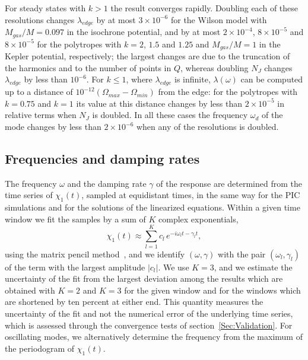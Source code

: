 For steady states with $k > 1$ the result converges rapidly. Doubling each of these resolutions changes $\lambda_{edge}$ by at most $3\times 10^{-6}$ for the Wilson model with $M_{gas}/M = 0.097$ in the isochrone potential, and by at most $2\times 10^{-4}$, $8\times 10^{-5}$ and $8\times 10^{-5}$ for the polytropes with $k = 2$, $1.5$ and $1.25$ and $M_{gas}/M = 1$ in the Kepler potential, respectively; the largest changes are due to the truncation of the harmonics and to the number of points in $Q$, whereas doubling $N_J$ changes $\lambda_{edge}$ by less than $10^{-6}$. For $k\leq 1$, where $\lambda_{edge}$ is infinite, $\lambda(\omega)$ can be computed up to a distance of $10^{-12}(\Omega_{max} - \Omega_{min})$ from the edge: for the polytropes with $k = 0.75$ and $k = 1$ its value at this distance changes by less than $2\times 10^{-5}$ in relative terms when $N_J$ is doubled. In all these cases the frequency $\omega_d$ of the mode changes by less than $2\times 10^{-6}$ when any of the resolutions is doubled.


\subsection{Frequencies and damping rates}
\label{SubSec:Fits}

The frequency $\omega$ and the damping rate $\gamma$ of the response are determined from the time series of $\chi_1(t)$, sampled at equidistant times, in the same way for the PIC simulations and for the solutions of the linearized equations. Within a given time window we fit the samples by a sum of $K$ complex exponentials,
\begin{equation}
\chi_1(t)\approx \sum\limits_{l=1}^K c_l\, e^{-i\omega_l t - \gamma_l t},
\label{Eq:PencilFit}
\end{equation}
using the matrix pencil method~\cite{yHtS90}, and we identify $(\omega,\gamma)$ with the pair $(\omega_l,\gamma_l)$ of the term with the largest amplitude $|c_l|$. We use $K = 3$, and we estimate the uncertainty of the fit from the largest deviation among the results which are obtained with $K = 2$ and $K = 3$ for the given window and for the windows which are shortened by ten percent at either end. This quantity measures the uncertainty of the fit and not the numerical error of the underlying time series, which is assessed through the convergence tests of section~\ref{Sec:Validation}. For oscillating modes, we alternatively determine the frequency from the maximum of the periodogram of $\chi_1(t)$.
